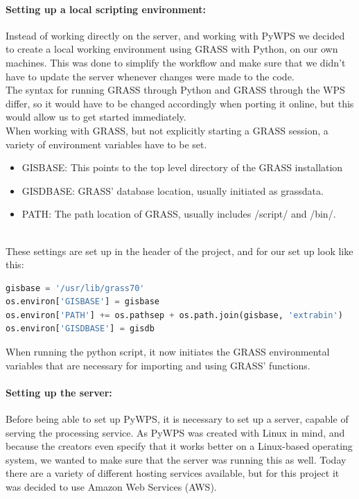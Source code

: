 \paragraph{Setting up a local scripting environment:} Instead of working directly on the server, and working with PyWPS we decided to create a local working environment using GRASS with Python, on our own machines. This was done to simplify the workflow and make sure that  we didn't have to update the server whenever changes were made to the code. \\
The syntax for running GRASS through Python and GRASS through the WPS differ, so it would have to be changed accordingly when porting it online, but this would allow us to get started immediately. \\
When working with GRASS, but not explicitly starting a GRASS session, a variety of environment variables have to be set. 

\begin{itemize}
\item \textsc{GISBASE}: This points to the top level directory of the GRASS installation
\item \textsc{GISDBASE}: GRASS' database location, usually initiated as grassdata.
\item \textsc{PATH}: The path location of GRASS, usually includes /script/ and /bin/.
\end{itemize} \\

These settings are set up in the header of the project, and for our set up look like this:

\begin{lstlisting}[language=Python]
gisbase = '/usr/lib/grass70'
os.environ['GISBASE'] = gisbase
os.environ['PATH'] += os.pathsep + os.path.join(gisbase, 'extrabin')
os.environ['GISDBASE'] = gisdb
\end{lstlisting}

When running the python script, it now initiates the GRASS environmental variables that are necessary for importing and using GRASS' functions.\\

\paragraph{Setting up the server:}Before being able to set up PyWPS, it is necessary to set up a server, capable of serving the processing service.  
As PyWPS was created with Linux in mind, and because the creators even specify that it works better on a Linux-based operating system, we wanted to make sure that the server was running this as well. Today there are a variety of different hosting services available, but for this project it was decided to use Amazon Web Services (AWS).\\

